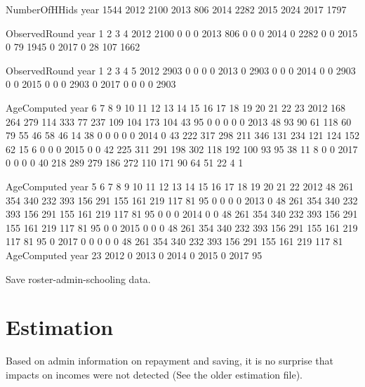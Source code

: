 \begin{Schunk}
\begin{Soutput}
      NumberOfHHids
year   1544
  2012 2100
  2013  806
  2014 2282
  2015 2024
  2017 1797
\end{Soutput}
\begin{Soutput}
      ObservedRound
year      1    2    3    4
  2012 2100    0    0    0
  2013  806    0    0    0
  2014    0 2282    0    0
  2015    0   79 1945    0
  2017    0   28  107 1662
\end{Soutput}
\begin{Soutput}
      ObservedRound
year      1    2    3    4    5
  2012 2903    0    0    0    0
  2013    0 2903    0    0    0
  2014    0    0 2903    0    0
  2015    0    0    0 2903    0
  2017    0    0    0    0 2903
\end{Soutput}
\begin{Soutput}
      AgeComputed
year     6   7   8   9  10  11  12  13  14  15  16  17  18  19  20  21  22  23
  2012 168 264 279 114 333  77 237 109 104 173 104  43  95   0   0   0   0   0
  2013  48  93  90  61 118  60  79  55  46  58  46  14  38   0   0   0   0   0
  2014   0  43 222 317 298 211 346 131 234 121 124 152  62  15   6   0   0   0
  2015   0   0  42 225 311 291 198 302 118 192 100  93  95  38  11   8   0   0
  2017   0   0   0   0  40 218 289 279 186 272 110 171  90  64  51  22   4   1
\end{Soutput}
\begin{Soutput}
      AgeComputed
year     5   6   7   8   9  10  11  12  13  14  15  16  17  18  19  20  21  22
  2012  48 261 354 340 232 393 156 291 155 161 219 117  81  95   0   0   0   0
  2013   0  48 261 354 340 232 393 156 291 155 161 219 117  81  95   0   0   0
  2014   0   0  48 261 354 340 232 393 156 291 155 161 219 117  81  95   0   0
  2015   0   0   0  48 261 354 340 232 393 156 291 155 161 219 117  81  95   0
  2017   0   0   0   0   0  48 261 354 340 232 393 156 291 155 161 219 117  81
      AgeComputed
year    23
  2012   0
  2013   0
  2014   0
  2015   0
  2017  95
\end{Soutput}
\end{Schunk}
Save roster-admin-schooling data.


\section{Estimation}

Based on admin information on repayment and saving, it is no surprise that impacts on incomes were not detected (See the older estimation file). 

